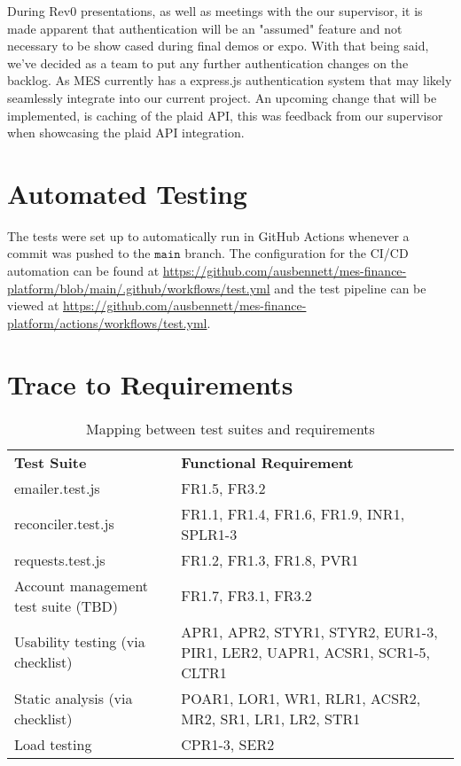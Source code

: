 \documentclass[12pt, titlepage]{article}
\begin{document}
During Rev0 presentations, as well as meetings with the our supervisor, it is made apparent that authentication will be an "assumed" feature and not necessary to be show cased during final demos or expo. With that being said, we've decided as a team to put any further authentication changes on the backlog. As MES currently has a express.js authentication system that may likely seamlessly integrate into our current project. An upcoming change that will be implemented, is caching of the plaid API, this was feedback from our supervisor when showcasing the plaid API integration. 

\section{Automated Testing}

The tests were set up to automatically run in GitHub Actions whenever a commit was pushed to the $\mathtt{main}$ branch.
The configuration for the CI/CD automation can be found at \url{https://github.com/ausbennett/mes-finance-platform/blob/main/.github/workflows/test.yml}
and the test pipeline can be viewed at \url{https://github.com/ausbennett/mes-finance-platform/actions/workflows/test.yml}.

\newpage

\section{Trace to Requirements}
\begin{table}[!h]
\begin{table}[H]
\begin{tabularx}{\textwidth}{p{5cm}p{5cm}}
\toprule {\bf Test Suite} & {\bf Functional Requirement}\\
  emailer.test.js & FR1.5, FR3.2\\
  reconciler.test.js & FR1.1, FR1.4, FR1.6, FR1.9, INR1, SPLR1-3\\
  requests.test.js & FR1.2, FR1.3, FR1.8, PVR1\\ 
  Account management test suite (TBD) & FR1.7, FR3.1, FR3.2\\
  Usability testing (via checklist) & APR1, APR2, STYR1, STYR2, EUR1-3, PIR1, LER2, UAPR1, ACSR1, SCR1-5, CLTR1\\
  Static analysis (via checklist) & POAR1, LOR1, WR1, RLR1, ACSR2, MR2, SR1, LR1, LR2, STR1\\
  Load testing & CPR1-3, SER2\\
\end{tabularx}
\caption{Mapping between test suites and requirements}
\end{table}
\end{table}
\end{document}
